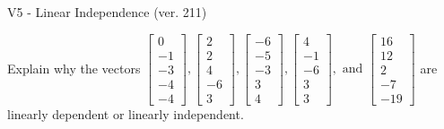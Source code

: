 \begin{exercise}
  \begin{exerciseTitle}V5 - Linear Independence (ver. 211)\end{exerciseTitle}
  \begin{exerciseStatement}
    Explain why the vectors \(\left[\begin{array}{r}
0 \\
-1 \\
-3 \\
-4 \\
-4
\end{array}\right] , \left[\begin{array}{r}
2 \\
2 \\
4 \\
-6 \\
3
\end{array}\right] , \left[\begin{array}{r}
-6 \\
-5 \\
-3 \\
3 \\
4
\end{array}\right] , \left[\begin{array}{r}
4 \\
-1 \\
-6 \\
3 \\
3
\end{array}\right] , \text{ and } \left[\begin{array}{r}
16 \\
12 \\
2 \\
-7 \\
-19
\end{array}\right]\) are linearly dependent or linearly independent.	



\end{exerciseStatement}
\end{exercise}

